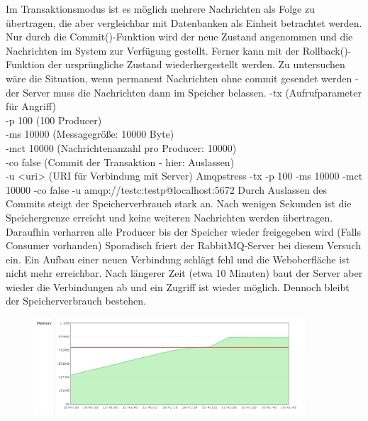 \documentclass[	a4paper,
			11pt,
			titlepage,
			oneside,
			fleqn,
			listof=totoc,
			parskip,
			chapterprefix=false,
			numbers=noenddot]{scrartcl}
\begin{document}
\clearpage
		{Im Transaktionsmodus ist es möglich mehrere Nachrichten als Folge zu übertragen, die aber vergleichbar mit Datenbanken als Einheit betrachtet werden. Nur durch die Commit()-Funktion wird der neue Zustand angenommen und die Nachrichten im System zur Verfügung gestellt. Ferner kann mit der Rollback()-Funktion der ursprüngliche Zustand wiederhergestellt werden. Zu untersuchen wäre die Situation, wenn permanent Nachrichten ohne commit gesendet werden - der Server muss die Nachrichten dann im Speicher belassen. }%
		{%
		 -tx (Aufrufparameter für Angriff) \\
		 -p 100 (100 Producer) \\
		 -ms 10000 (Messagegröße: 10000 Byte) \\
		 -mct 10000 (Nachrichtenanzahl pro Producer: 10000) \\
		 -co false (Commit der Transaktion - hier: Auslassen) \\
		 -u <uri> (URI für Verbindung mit Server)
		}%
		{Amqpstress -tx -p 100 -ms 10000 -mct 10000 -co false -u amqp://testc:testp@localhost:5672}%
		{Durch Auslassen des Commits steigt der Speicherverbrauch stark an. Nach wenigen Sekunden ist die Speichergrenze erreicht und keine weiteren Nachrichten werden übertragen. Daraufhin verharren alle Producer bis der Speicher wieder freigegeben wird (Falls Consumer vorhanden) }
		{Sporadisch friert der RabbitMQ-Server bei diesem Versuch ein. Ein Aufbau einer neuen Verbindung schlägt fehl und die Weboberfläche ist nicht mehr erreichbar. Nach längerer Zeit (etwa 10 Minuten) baut der Server aber wieder die Verbindungen ab und ein Zugriff ist wieder möglich. Dennoch bleibt der Speicherverbrauch bestehen.}

\begin{figure}[H]
	\vspace{0.5cm}
	\centering
	\includegraphics[width=0.9\textwidth]{img/commit/noCommit100p}
\end{figure}
\end{document}
